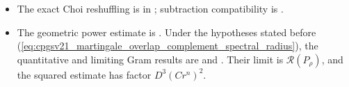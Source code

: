 \documentclass{article}
\begin{document}
\begin{itemize}
    \item The exact Choi reshuffling is
           in
          ; subtraction
          compatibility is .

    \item The geometric power estimate is
          . Under the hypotheses
          stated before
          (\ref{eq:cpgsv21_martingale_overlap_complement_spectral_radius}), the
          quantitative and limiting Gram results are
          and
          .
          Their limit is $\mathscr R(P_\rho)$, and the squared estimate has factor
          $D^3(Cr^n)^2$.


\end{itemize}
\end{document}
